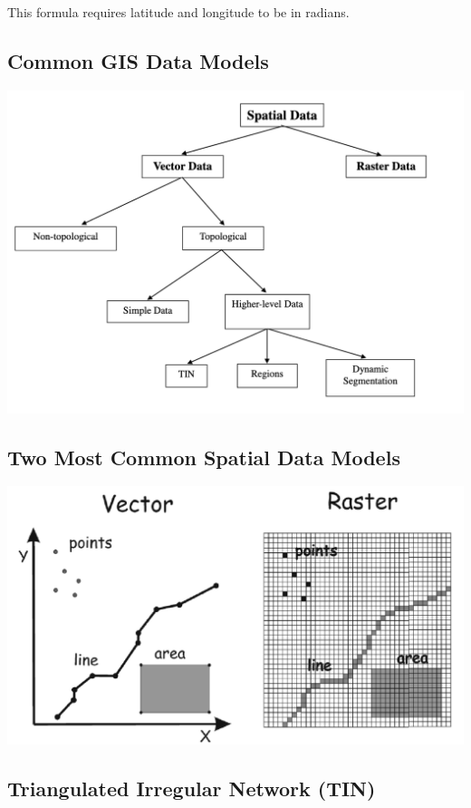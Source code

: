 \documentclass[11pt]{article}
\theoremstyle{definition}
\begin{document}
This formula requires latitude and longitude to be in radians.

\subsection{Common GIS Data Models}
\includegraphics[width=\textwidth/2]{15.png}

\subsection{Two Most Common
Spatial Data Models}

\includegraphics[width=\textwidth/3]{16.png}

\subsection{Triangulated Irregular Network
(TIN)}
\end{document}
